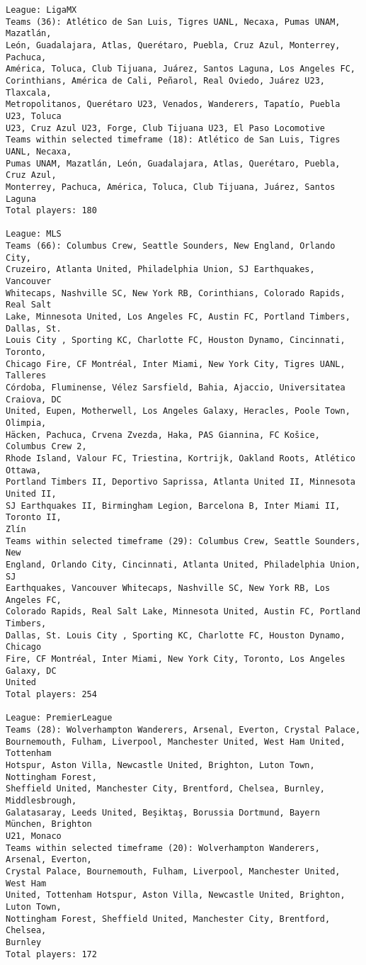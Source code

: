 \documentclass[11pt]{article}
\begin{document}
\begin{Verbatim}[commandchars=\\\{\}]
League: LigaMX
Teams (36): Atlético de San Luis, Tigres UANL, Necaxa, Pumas UNAM, Mazatlán,
León, Guadalajara, Atlas, Querétaro, Puebla, Cruz Azul, Monterrey, Pachuca,
América, Toluca, Club Tijuana, Juárez, Santos Laguna, Los Angeles FC,
Corinthians, América de Cali, Peñarol, Real Oviedo, Juárez U23, Tlaxcala,
Metropolitanos, Querétaro U23, Venados, Wanderers, Tapatío, Puebla U23, Toluca
U23, Cruz Azul U23, Forge, Club Tijuana U23, El Paso Locomotive
Teams within selected timeframe (18): Atlético de San Luis, Tigres UANL, Necaxa,
Pumas UNAM, Mazatlán, León, Guadalajara, Atlas, Querétaro, Puebla, Cruz Azul,
Monterrey, Pachuca, América, Toluca, Club Tijuana, Juárez, Santos Laguna
Total players: 180

League: MLS
Teams (66): Columbus Crew, Seattle Sounders, New England, Orlando City,
Cruzeiro, Atlanta United, Philadelphia Union, SJ Earthquakes, Vancouver
Whitecaps, Nashville SC, New York RB, Corinthians, Colorado Rapids, Real Salt
Lake, Minnesota United, Los Angeles FC, Austin FC, Portland Timbers, Dallas, St.
Louis City , Sporting KC, Charlotte FC, Houston Dynamo, Cincinnati, Toronto,
Chicago Fire, CF Montréal, Inter Miami, New York City, Tigres UANL, Talleres
Córdoba, Fluminense, Vélez Sarsfield, Bahia, Ajaccio, Universitatea Craiova, DC
United, Eupen, Motherwell, Los Angeles Galaxy, Heracles, Poole Town, Olimpia,
Häcken, Pachuca, Crvena Zvezda, Haka, PAS Giannina, FC Košice, Columbus Crew 2,
Rhode Island, Valour FC, Triestina, Kortrijk, Oakland Roots, Atlético Ottawa,
Portland Timbers II, Deportivo Saprissa, Atlanta United II, Minnesota United II,
SJ Earthquakes II, Birmingham Legion, Barcelona B, Inter Miami II, Toronto II,
Zlín
Teams within selected timeframe (29): Columbus Crew, Seattle Sounders, New
England, Orlando City, Cincinnati, Atlanta United, Philadelphia Union, SJ
Earthquakes, Vancouver Whitecaps, Nashville SC, New York RB, Los Angeles FC,
Colorado Rapids, Real Salt Lake, Minnesota United, Austin FC, Portland Timbers,
Dallas, St. Louis City , Sporting KC, Charlotte FC, Houston Dynamo, Chicago
Fire, CF Montréal, Inter Miami, New York City, Toronto, Los Angeles Galaxy, DC
United
Total players: 254

League: PremierLeague
Teams (28): Wolverhampton Wanderers, Arsenal, Everton, Crystal Palace,
Bournemouth, Fulham, Liverpool, Manchester United, West Ham United, Tottenham
Hotspur, Aston Villa, Newcastle United, Brighton, Luton Town, Nottingham Forest,
Sheffield United, Manchester City, Brentford, Chelsea, Burnley, Middlesbrough,
Galatasaray, Leeds United, Beşiktaş, Borussia Dortmund, Bayern München, Brighton
U21, Monaco
Teams within selected timeframe (20): Wolverhampton Wanderers, Arsenal, Everton,
Crystal Palace, Bournemouth, Fulham, Liverpool, Manchester United, West Ham
United, Tottenham Hotspur, Aston Villa, Newcastle United, Brighton, Luton Town,
Nottingham Forest, Sheffield United, Manchester City, Brentford, Chelsea,
Burnley
Total players: 172


\end{Verbatim}
\end{document}
